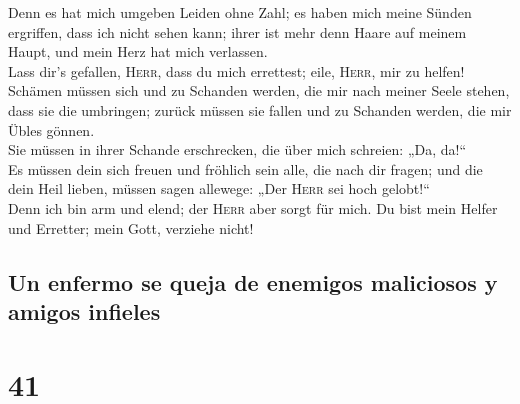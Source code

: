  Denn es hat mich umgeben Leiden ohne Zahl; es haben mich
meine Sünden ergriffen, dass ich nicht sehen kann; ihrer ist mehr denn
Haare auf meinem Haupt, und mein Herz hat mich verlassen.\\
 Lass dir's gefallen, \textsc{Herr}, dass du mich
errettest; eile, \textsc{Herr}, mir zu helfen!\\
 Schämen müssen sich und zu Schanden werden, die mir nach
meiner Seele stehen, dass sie die umbringen; zurück müssen sie fallen
und zu Schanden werden, die mir Übles gönnen.\\
 Sie müssen in ihrer Schande erschrecken, die über mich
schreien: „Da, da!{}``\\
 Es müssen dein sich freuen und fröhlich sein alle, die
nach dir fragen; und die dein Heil lieben, müssen sagen allewege: „Der
\textsc{Herr} sei hoch gelobt!{}``\\
 Denn ich bin arm und elend; der \textsc{Herr} aber sorgt
für mich. Du bist mein Helfer und Erretter; mein Gott, verziehe nicht!

\hypertarget{un-enfermo-se-queja-de-enemigos-maliciosos-y-amigos-infieles}{%
\subsection{Un enfermo se queja de enemigos maliciosos y amigos
infieles}\label{un-enfermo-se-queja-de-enemigos-maliciosos-y-amigos-infieles}}

\hypertarget{section-40}{%
\section{41}\label{section-40}}

